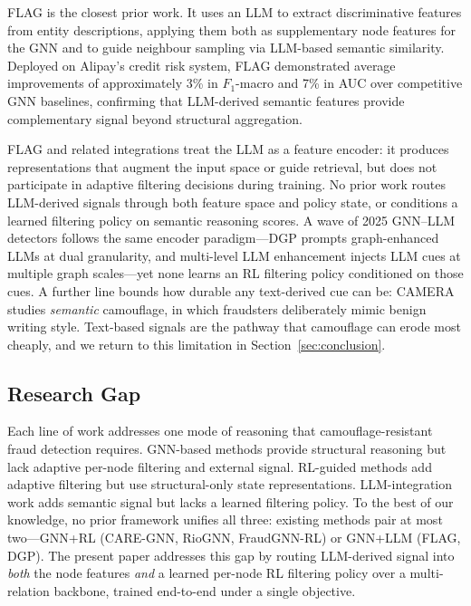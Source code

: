 \documentclass{conf}
\begin{document}
FLAG \cite{yang2025flag} is the closest prior work. It uses an LLM
to extract discriminative features from entity descriptions, applying
them both as supplementary node features for the GNN and to guide
neighbour sampling via LLM-based semantic similarity. Deployed on
Alipay's credit risk system, FLAG demonstrated average improvements
of approximately 3\% in $F_1$-macro and 7\% in AUC over competitive
GNN baselines, confirming that LLM-derived semantic features provide
complementary signal beyond structural aggregation.

FLAG and related integrations treat the LLM as a feature encoder:
it produces representations that augment the input space or guide
retrieval, but does not participate in adaptive filtering decisions
during training. No prior work routes LLM-derived signals through
both feature space and policy state, or conditions a learned
filtering policy on semantic reasoning scores. A wave of 2025
GNN--LLM detectors follows the same encoder paradigm---DGP \cite{dgp2025}
prompts graph-enhanced LLMs at dual granularity, and multi-level LLM
enhancement \cite{multilevelllm2025} injects LLM cues at multiple graph
scales---yet none learns an RL filtering policy conditioned on those cues.
A further line bounds how durable any text-derived cue can be: CAMERA
\cite{pan2026camera} studies \emph{semantic} camouflage, in which fraudsters
deliberately mimic benign writing style. Text-based signals are the pathway
that camouflage can erode most cheaply, and we return to this limitation in
Section~\ref{sec:conclusion}.

\subsection{Research Gap}

Each line of work addresses one mode of reasoning that
camouflage-resistant fraud detection requires. GNN-based methods
provide structural reasoning but lack adaptive per-node filtering
and external signal. RL-guided methods add adaptive filtering but
use structural-only state representations. LLM-integration work
adds semantic signal but lacks a learned filtering policy. To the best
of our knowledge, no prior framework unifies all three: existing methods
pair at most two---GNN+RL (CARE-GNN, RioGNN, FraudGNN-RL) or GNN+LLM
(FLAG, DGP). The present paper addresses this gap by routing LLM-derived
signal into \emph{both} the node features \emph{and} a learned per-node
RL filtering policy over a multi-relation backbone, trained end-to-end
under a single objective.
\end{document}
